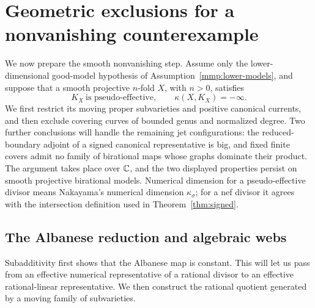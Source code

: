 \section{Geometric exclusions for a nonvanishing counterexample}
\label{sec:exclusions}

We now prepare the smooth nonvanishing step. Assume only the
lower-dimensional good-model hypothesis of
Assumption~\ref{mmp:lower-models}, and suppose that a smooth
projective \(n\)-fold \(X\), with \(n>0\), satisfies
\begin{equation}\label{ex:counterexample}
 K_X\ \text{is pseudo-effective},
 \qquad \kappa(X,K_X)=-\infty.
\end{equation}
We first restrict its moving proper subvarieties and positive canonical
currents, and then exclude covering curves of bounded genus and normalized
degree. Two further conclusions will handle the remaining jet
configurations: the reduced-boundary adjoint of a signed canonical
representative is big, and fixed finite covers admit no family of
birational maps whose graphs dominate their product. The argument takes
place over \(\mathbb{C}\), and the two displayed properties persist on smooth
projective birational models. Numerical dimension for a
pseudo-effective divisor means Nakayama's numerical dimension
\(\kappa_\sigma\); for a nef divisor it agrees with the intersection
definition used in Theorem~\ref{thm:signed}.

\subsection{The Albanese reduction and algebraic webs}

Subadditivity first shows that the Albanese map is constant. This
will let us pass from an effective numerical representative of a
rational divisor to an effective rational-linear representative.
We then construct the rational quotient generated by a moving
family of subvarieties.

